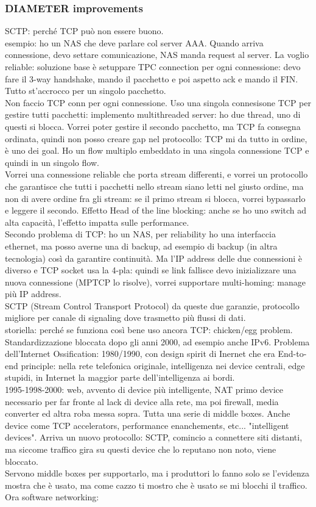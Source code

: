 \documentclass[16px]{article}
\begin{document}
\subsubsection{DIAMETER improvements}
SCTP: perché TCP può non essere buono.\\ esempio: ho un NAS che deve parlare col server AAA. Quando arriva connessione, devo settare comunicazione, NAS manda request al server. La voglio reliable: soluzione base è setuppare TPC connection per ogni connessione: devo fare il 3-way handshake, mando il pacchetto e poi aspetto ack e mando il FIN. Tutto st'accrocco per un singolo pacchetto.\\ Non faccio TCP conn per ogni connessione. Uso una singola connesisone TCP per gestire tutti pacchetti: implemento multithreaded server: ho due thread, uno di questi si blocca. Vorrei poter gestire il secondo pacchetto, ma TCP fa consegna ordinata, quindi non posso creare gap nel protocollo: TCP mi da tutto in ordine, è uno dei goal. Ho un flow multiplo embeddato in una singola connessione TCP e quindi in un singolo flow.\\ Vorrei una connessione reliable che porta stream differenti, e vorrei un protocollo che garantisce che tutti i pacchetti nello stream siano letti nel giusto ordine, ma non di avere ordine fra gli stream: se il primo stream si blocca, vorrei bypassarlo e leggere il secondo. Effetto Head of the line blocking: anche se ho uno switch ad alta capacità, l'effetto impatta sulle performance.\\ Secondo problema di TCP: ho un NAS, per reliability ho una interfaccia ethernet, ma posso averne una di backup, ad esempio di backup (in altra tecnologia) così da garantire continuità. Ma l'IP address delle due connessioni è diverso e TCP socket usa la 4-pla: quindi se link fallisce devo inizializzare una nuova connessione (MPTCP lo risolve), vorrei supportare multi-homing: manage più IP address.\\ SCTP (Stream Control Transport Protocol) da queste due garanzie, protocollo migliore per canale di signaling dove trasmetto più flussi di dati. \\ storiella: perché se funziona così bene uso ancora TCP: chicken/egg problem. Standardizzazione bloccata dopo gli anni 2000, ad esempio anche IPv6. Problema dell'Internet Ossification: 1980/1990, con design spirit di Inernet che era End-to-end principle: nella rete telefonica originale, intelligenza nei device centrali, edge stupidi, in Internet la maggior parte dell'intelligenza ai bordi.\\1995-1998-2000: web, avvento di device più intelligente, NAT primo device necessario per far fronte al lack di device alla rete,  ma poi firewall, media converter ed altra roba messa sopra. Tutta una serie di middle boxes. Anche device come TCP accelerators, performance enanchements, etc... "intelligent devices". Arriva un nuovo protocollo: SCTP, comincio a connettere siti distanti, ma siccome traffico gira su questi device che lo reputano non noto, viene bloccato.\\ Servono middle boxes per supportarlo, ma i produttori lo fanno solo se l'evidenza mostra che è usato, ma come cazzo ti mostro che è usato se mi blocchi il traffico. Ora software networking: 
\end{document}

